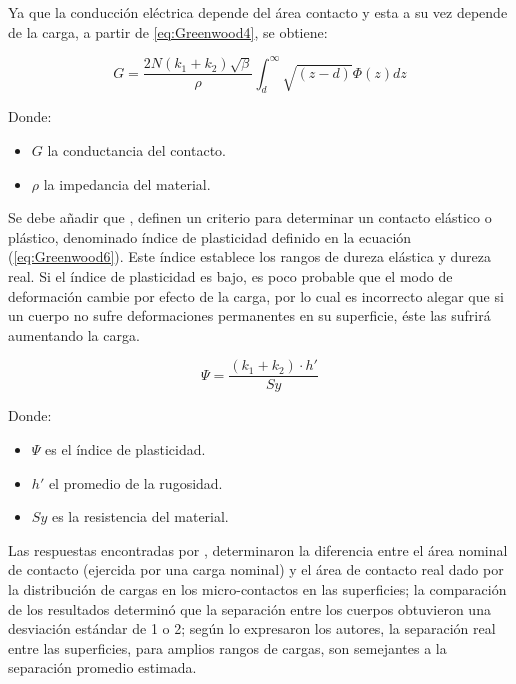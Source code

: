 \documentclass[main]{subfiles}
\begin{document}
Ya que la conducción eléctrica depende del área contacto y esta a su vez depende de la carga, a partir de \ref{eq:Greenwood4}, se obtiene:

\begin{equation}
\label{eq:Greenwood5}
G=\frac{2N (k_1+k_2) \sqrt{\beta}}{\rho}
 \int_d^\infty \sqrt{(z-d)}\Phi(z) dz
\end{equation}

\par \hspace{1cm}
\begin{minipage}{10cm}
\begin{spacing}{0.5}
Donde:
\begin{itemize}
\item $G$ la conductancia del contacto.
\item $\rho$ la impedancia del material.
\end{itemize}
\end{spacing}
\end{minipage}

Se debe añadir que \citet{Greenwood06121966}, definen un criterio para determinar un contacto elástico o plástico, denominado índice de plasticidad definido en la ecuación (\ref{eq:Greenwood6}). Este índice establece los rangos de dureza elástica y dureza real. Si el índice de plasticidad es bajo, es poco probable que el modo de deformación cambie por efecto de la carga, por lo cual es incorrecto alegar que si un cuerpo no sufre deformaciones permanentes en su superficie, éste las sufrirá aumentando la carga.

\begin{equation}
\label{eq:Greenwood6}
\Psi=\frac{(k_1+k_2)\cdot h'}{Sy}
\end{equation}

\par \hspace{2cm}
\begin{minipage}{8cm}
\begin{spacing}{0.5}
Donde:
\begin{itemize}
\item $\Psi$ es el índice de plasticidad.
\item $h'$ el promedio de la rugosidad.
\item $Sy$ es la resistencia del material.
\end{itemize}
\end{spacing}
\end{minipage}

  Las respuestas encontradas por \citet{Greenwood06121966}, determinaron la diferencia entre el área nominal de contacto (ejercida por una carga nominal) y el área de contacto real dado por la distribución de cargas en los micro-contactos en las superficies; la comparación de los resultados determinó que la separación entre los cuerpos obtuvieron una desviación estándar de 1 o 2; según lo expresaron los autores, la separación real entre las superficies, para amplios rangos de cargas, son semejantes a la separación promedio estimada. 
\end{document}
